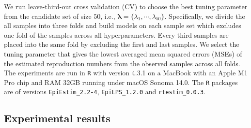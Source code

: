We run leave-third-out cross validation (CV) to choose the best tuning parameter from the candidate set of size $50$, i.e., $\boldsymbol{\lambda} = \{\lambda_1, \cdots, \lambda_{50}\}$. Specifically, we divide the all samples into three folds and build models on each sample set which excludes one fold of the samples across all hyperparameters. Every third samples are placed into the same fold by excluding the first and last samples. We select the tuning parameter that gives the lowest averaged mean squared errors (MSEs) of the estimated reproduction numbers from the observed samples across all folds. 
The experiments are run in \texttt{R} with version 4.3.1 on a MacBook with an Apple M1 Pro chip and RAM 32GB running under macOS Sonoma 14.0. The \texttt{R} packages are of versions \texttt{EpiEstim\_2.2-4}, \texttt{EpiLPS\_1.2.0} and \texttt{rtestim\_0.0.3}. 

\subsection{Experimental results}

